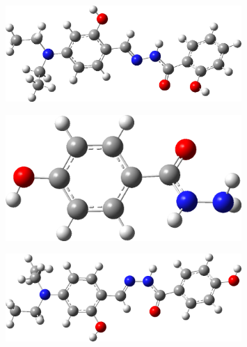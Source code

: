 \begin{figure}[H]
	\centering
	\includegraphics[width=0.8\textwidth]{media/chem2/image32}
	\caption*{}
\end{figure}

\begin{figure}[H]
	\centering
	\includegraphics[width=0.8\textwidth]{media/chem2/image33}
	\caption*{}
\end{figure}

\begin{figure}[H]
	\centering
	\includegraphics[width=0.8\textwidth]{media/chem2/image34}
	\caption*{}
\end{figure}


